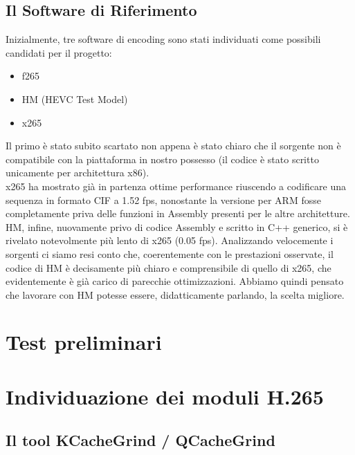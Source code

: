 \subsection{Il Software di Riferimento}
Inizialmente, tre software di encoding sono stati individuati come possibili
candidati per il progetto:
\begin{itemize}
	\item f265
	\item HM (HEVC Test Model)
	\item x265
\end{itemize}
Il primo è stato subito scartato non appena è stato chiaro che il sorgente non 
è compatibile con la piattaforma in nostro possesso (il codice è stato scritto 
unicamente per architettura x86).\\
x265 ha mostrato già in partenza ottime performance riuscendo a 
codificare una sequenza in formato CIF a 1.52 fps, nonostante la versione per 
ARM fosse completamente priva delle funzioni in Assembly presenti per le altre 
architetture.\\
HM, infine, nuovamente privo di codice Assembly e scritto in C++ generico, si è 
rivelato notevolmente più lento di x265 (0.05 fps). Analizzando velocemente i 
sorgenti 
ci siamo resi conto che, coerentemente con le prestazioni osservate, il codice 
di HM è decisamente più chiaro e comprensibile di quello di x265, che 
evidentemente è già carico di parecchie ottimizzazioni. Abbiamo quindi pensato 
che 
lavorare con HM potesse essere, didatticamente parlando, la scelta migliore.
\section{Test preliminari}
\section{Individuazione dei moduli H.265}

\subsection{Il tool KCacheGrind / QCacheGrind}

